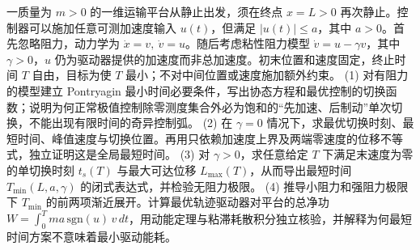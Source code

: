 一质量为 \(m>0\) 的一维运输平台从静止出发，须在终点 \(x=L>0\) 再次静止。控制器可以施加任意可测加速度输入 \(u(t)\)，但满足 \(|u(t)|\le a\)，其中 \(a>0\)。首先忽略阻力，动力学为 \(\dot x=v,\ \dot v=u\)。随后考虑粘性阻力模型 \(\dot v=u-\gamma v\)，其中 \(\gamma>0\)，\(u\) 仍为驱动器提供的加速度而非总加速度。初末位置和速度固定，终止时间 \(T\) 自由，目标为使 \(T\) 最小；不对中间位置或速度施加额外约束。
(1) 对有阻力的模型建立 Pontryagin 最小时间必要条件，写出协态方程和最优控制的切换函数；说明为何正常极值控制除零测度集合外必为饱和的“先加速、后制动”单次切换，不能出现有限时间的奇异控制弧。
(2) 在 \(\gamma=0\) 情况下，求最优切换时刻、最短时间、峰值速度与切换位置。再用只依赖加速度上界及两端零速度的位移不等式，独立证明这是全局最短时间。
(3) 对 \(\gamma>0\)，求任意给定 \(T\) 下满足末速度为零的单切换时刻 \(t_s(T)\) 与最大可达位移 \(L_{\max}(T)\)，从而导出最短时间 \(T_{\min}(L,a,\gamma)\) 的闭式表达式，并检验无阻力极限。
(4) 推导小阻力和强阻力极限下 \(T_{\min}\) 的前两项渐近展开。计算最优轨迹驱动器对平台的总净功 \(W=\int_0^T ma\,\mathrm{sgn}(u)\,v\,dt\)，用动能定理与粘滞耗散积分独立核验，并解释为何最短时间方案不意味着最小驱动能耗。
